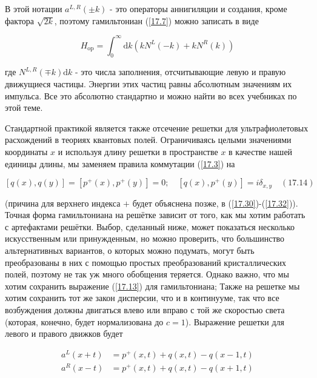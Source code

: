 \documentclass[main.tex]{subfiles}
\begin{document}
В этой нотации $a^{L, R}(\pm k)$ - это операторы аннигиляции и создания, кроме фактора $\sqrt{2 k}$, поэтому гамильтониан (\ref{17.7}) можно записать в виде

\begin{equation}\label{17.13}
H_{\mathrm{op}}=\int_{0}^{\infty} \mathrm{d} k\left(k N^{L}(-k)+k N^{R}(k)\right)
\end{equation}

где $N^{L, R}(\mp k) \mathrm{d} k$ - это числа заполнения, отсчитывающие левую и правую движущиеся частицы. Энергии этих частиц равны абсолютным значениям их импульса. Все это абсолютно стандартно и можно найти во всех учебниках по этой теме.

Стандартной практикой является также отсечение решетки для ультрафиолетовых расхождений в теориях квантовых полей. Ограничиваясь целыми значениями координаты $x$ и используя длину решетки в пространстве $x$ в качестве нашей единицы длины, мы заменяем правила коммутации (\ref{17.3}) на

\begin{equation}\label{17.14}
[q(x), q(y)]=\left[p^{+}(x), p^{+}(y)\right]=0 ; \quad\left[q(x), p^{+}(y)\right]=i \delta_{x, y} \quad(17.14)
\end{equation}

(причина для верхнего индекса $+$ будет объяснена позже, в (\ref{17.30})-(\ref{17.32})). Точная форма гамильтониана на решётке зависит от того, как мы хотим работать с артефактами решётки. Выбор, сделанный ниже, может показаться несколько искусственным или принужденным, но можно проверить, что большинство альтернативных вариантов, о которых можно подумать, могут быть преобразованы в них с помощью простых преобразований кристаллических полей, поэтому не так уж много обобщения теряется. Однако важно, что мы хотим сохранить выражение (\ref{17.13}) для гамильтониана; Также на решетке мы хотим сохранить тот же закон дисперсии, что и в континууме, так что все возбуждения должны двигаться влево или вправо с той же скоростью света (которая, конечно, будет нормализована до $c=1$). Выражение решетки для левого и правого движков будет

\begin{equation}\label{17.15}
	\begin{aligned} a^{L}(x+t) &=p^{+}(x, t)+q(x, t)-q(x-1, t) \\ a^{R}(x-t) &=p^{+}(x, t)+q(x, t)-q(x+1, t) \end{aligned}
\end{equation}
\end{document}
